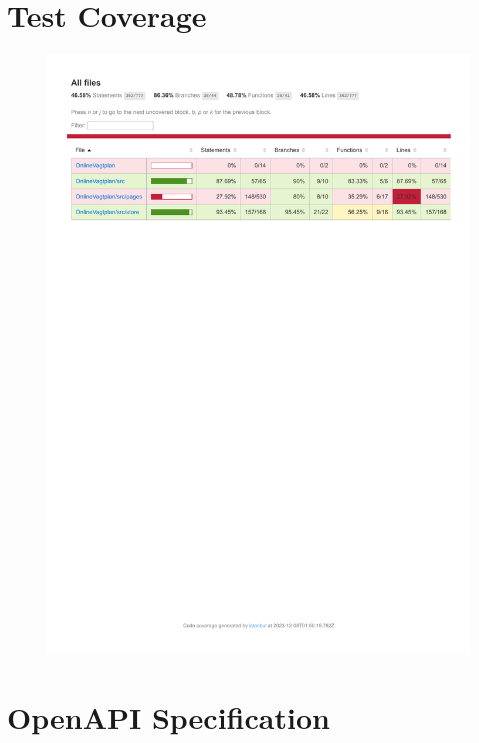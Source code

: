 \documentclass{report}
\begin{document}
\chapter{Test Coverage}
\begin{figure}[h]
	\label{appendix:coverage}
	\includegraphics*[width=\textwidth,trim= 0 8in 0 0]{coverage.pdf}
\end{figure}

\chapter{OpenAPI Specification}

\label{openapi}
\inputminted{yaml}{../openapi.yml}
\end{document}
